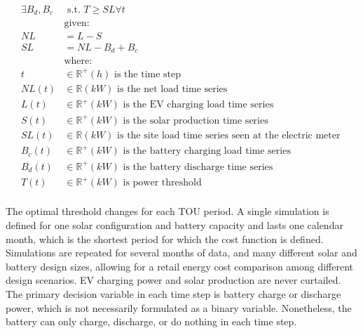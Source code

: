 \documentclass[journal,article,submit,pdftex,moreauthors]{Definitions/mdpi}
\begin{document}
\begin{equation}
  \label{eq:net-load}
  \begin{split}
    \exists B_d, B_c &\text{ s.t. } T \ge SL \forall t                                    \\      
            & \text{given:}                                                                        \\
    NL     & = L - S                                                                              \\
    SL     & = NL - B_d + B_c                                                                     \\
            & \text{where:}                                                                        \\
    t      & \in \mathbb{R}^+ (h) \text{ is the time step }      \\             
    NL(t)  & \in \mathbb{R} (kW) \text{ is the net load time series }                             \\
    L(t)   & \in \mathbb{R}^+ (kW) \text{ is the EV charging load time series }                   \\
    S(t)   & \in \mathbb{R}^+ (kW) \text{ is the solar production time series }                   \\
    SL(t)  & \in \mathbb{R} (kW) \text{ is the site load time series seen at the electric meter } \\
    B_c(t) & \in \mathbb{R}^+ (kW) \text{ is the battery charging load time series }              \\
    B_d(t) & \in \mathbb{R}^+ (kW) \text{ is the battery discharge time series }                  \\
    T(t)   & \in \mathbb{R}^+ (kW) \text{ is power threshold }                                    \\
  \end{split}
\end{equation}

The optimal threshold changes for each TOU period. A single simulation is defined for one solar configuration and battery capacity and lasts one calendar month, which is the shortest period for which the cost function is defined. Simulations are repeated for several months of data, and many different solar and battery design sizes, allowing for a retail energy cost comparison among different design scenarios. EV charging power and solar production are never curtailed. The primary decision variable in each time step is battery charge or discharge power, which is not necessarily formulated as a binary variable. Nonetheless, the battery can only charge, discharge, or do nothing in each time step.
\end{document}
